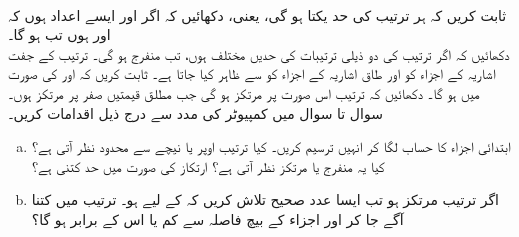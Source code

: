 \\
ثابت کریں کہ ہر ترتیب کی حد یکتا ہو گی، یعنی، دکھائیں کہ اگر  اور  ایسے اعداد ہوں کہ  اور  ہوں تب  ہو گا۔
\\
دکھائیں کہ اگر ترتیب  کی  دو ذیلی ترتیبات کی حدیں مختلف ہوں،  تب  منفرج   ہو گی۔ 
ترتیب  کے جفت اشاریہ کے اجزاء کو  اور طاق اشاریہ کے اجزاء کو  سے ظاہر کیا جاتا ہے۔ ثابت کریں کہ  اور  کی صورت میں  ہو گا۔
دکھائیں کہ ترتیب  اس صورت  پر مرتکز ہو گی جب مطلق قیمتیں  صفر پر مرتکز ہوں۔
\\
سوال  تا سوال  میں کمپیوٹر کی مدد سے درج ذیل اقدامات کریں۔
\begin{enumerate}[a.]
\item
ابتدائی  اجزاء کا حساب لگا کر انہیں ترسیم کریں۔ کیا ترتیب اوپر یا نیچے سے محدود نظر آتی ہے؟ کیا یہ منفرج یا مرتکز نظر آتی ہے؟ ارتکاز کی صورت میں حد  کتنی ہے؟
\item
اگر ترتیب مرتکز ہو تب ایسا عدد صحیح  تلاش کریں کہ  کے لیے  ہو۔ ترتیب میں کتنا آگے جا کر   اور اجزاء کے بیچ فاصلہ  سے کم یا  اس کے  برابر  ہو گا؟
\end{enumerate}

